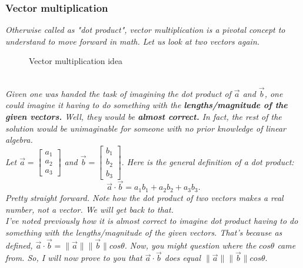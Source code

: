 \documentclass[addpoints]{exam}
\begin{document}
\pagebreak\subsubsection{
Vector multiplication
}
\textit{
Otherwise called as "dot product", vector multiplication is a pivotal concept to understand to move forward in math. Let us look at two vectors again. 
}
\begin{figure}[!h]
    \centering
    \caption{Vector multiplication idea}
    \label{fig:vector multiplication idea}
\end{figure}\\
\textit{
Given one was handed the task of imagining the dot product of $\vec{a}$ and $\vec{b}$, one could imagine it having to do something with the \textbf{lengths/magnitude of the given vectors.} Well, they would be \textbf{almost correct.} In fact, the rest of the solution would be unimaginable for someone with no prior knowledge of linear algebra.\\
}
\textit{
Let $\vec{a}=\begin{bmatrix}a_1\\a_2\\a_3\end{bmatrix}$ and $\vec{b} = \begin{bmatrix}b_1\\b_2\\b_3\end{bmatrix}.$ Here is the general definition of a dot product: \[\vec{a}\cdot\vec{b}=a_1b_1+a_2b_2+a_3b_3.\] Pretty straight forward. Note how the dot product of two vectors makes a real number, not a vector. We will get back to that.
\\
I've noted previously how it is almost correct to imagine dot product having to do something with the lengths/magnitude of the given vectors. That's because as defined, $\vec{a}\cdot\vec{b}=\|\vec{a}\|\|\vec{b}\|cos\theta.$ Now, you might question where the $cos\theta$ came from. So, I will now prove to you that $\vec{a}\cdot\vec{b}$ does equal $\|\vec{a}\|\|\vec{b}\|cos\theta.$
}
\end{document}
